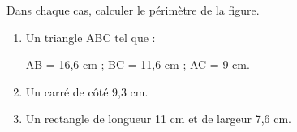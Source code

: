 \documentclass[exercice]{thedocument}%
\begin{document}
%
Dans chaque cas, calculer le périmètre de la figure.
\begin{enumerate}
    \item Un triangle ABC tel que :\par AB = 16,6 cm ;
    BC = 11,6 cm ; AC = 9 cm.
    \item Un carré de côté 9,3 cm.
    \item Un rectangle de longueur 11 cm et de largeur 7,6 cm.
\end{enumerate}
\end{document}
